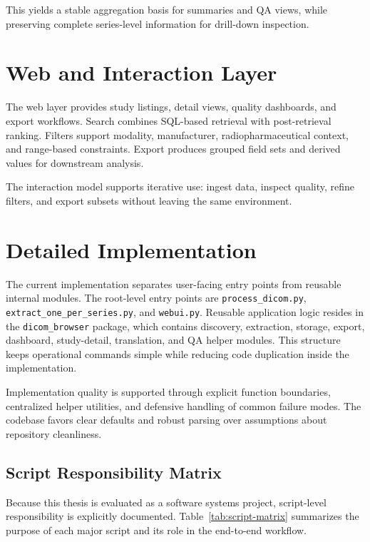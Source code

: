 This yields a stable aggregation basis for summaries and QA views, while preserving complete series-level information for drill-down inspection.

\section{Web and Interaction Layer}
The web layer provides study listings, detail views, quality dashboards, and export workflows. Search combines SQL-based retrieval with post-retrieval ranking. Filters support modality, manufacturer, radiopharmaceutical context, and range-based constraints. Export produces grouped field sets and derived values for downstream analysis.

The interaction model supports iterative use: ingest data, inspect quality, refine filters, and export subsets without leaving the same environment.

\section{Detailed Implementation}
The current implementation separates user-facing entry points from reusable internal modules. The root-level entry points are \texttt{process\_dicom.py}, \texttt{extract\_one\_per\_series.py}, and \texttt{webui.py}. Reusable application logic resides in the \texttt{dicom\_browser} package, which contains discovery, extraction, storage, export, dashboard, study-detail, translation, and QA helper modules. This structure keeps operational commands simple while reducing code duplication inside the implementation.

Implementation quality is supported through explicit function boundaries, centralized helper utilities, and defensive handling of common failure modes. The codebase favors clear defaults and robust parsing over assumptions about repository cleanliness.

\subsection{Script Responsibility Matrix}
Because this thesis is evaluated as a software systems project, script-level responsibility is explicitly documented. Table~\ref{tab:script-matrix} summarizes the purpose of each major script and its role in the end-to-end workflow.

